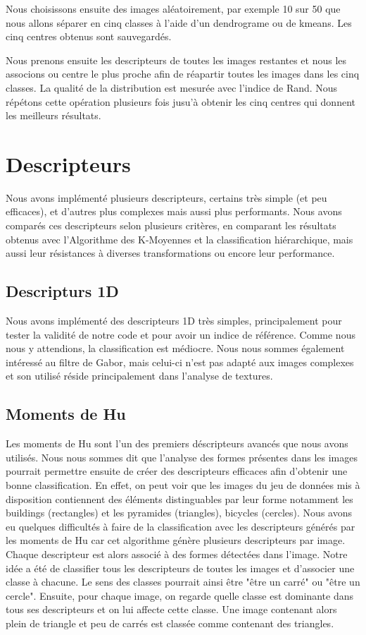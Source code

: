 \documentclass[12pt,a4paper,utf8x]{report}
\begin{document}
    Nous choisissons ensuite des images aléatoirement, par exemple 10 sur 50 que nous allons séparer en cinq classes à l'aide d'un dendrograme ou de kmeans. Les cinq centres obtenus sont sauvegardés.

    Nous prenons ensuite les descripteurs de toutes les images restantes et nous les associons ou centre le plus proche afin de réapartir toutes les images dans les cinq classes. La qualité de la distribution est mesurée avec l'indice de Rand. Nous répétons cette opération plusieurs fois jusu'à obtenir les cinq centres qui donnent les meilleurs résultats.


\chapter{Descripteurs}
    Nous avons implémenté plusieurs descripteurs, certains très simple (et peu efficaces), et d'autres plus complexes mais aussi plus performants. Nous avons comparés ces descripteurs selon plusieurs critères, en comparant les résultats obtenus avec l'Algorithme des K-Moyennes et la classification hiérarchique, mais aussi leur résistances à diverses transformations ou encore leur performance.

    \section{Descripturs 1D}
        Nous avons implémenté des descripteurs 1D très simples, principalement pour tester la validité de notre code et pour avoir un indice de référence. Comme nous nous y attendions, la classification est médiocre. Nous nous sommes également intéressé au filtre de Gabor, mais celui-ci n'est pas adapté aux images complexes et son utilisé réside principalement dans l'analyse de textures.

    \section{Moments de Hu}

        Les moments de Hu sont l'un des premiers déscripteurs avancés que nous avons utilisés. Nous nous sommes dit que l'analyse des formes présentes dans les images pourrait permettre ensuite de créer des descripteurs efficaces afin d'obtenir une bonne classification. En effet, on peut voir que les images du jeu de données mis à disposition contiennent des éléments distinguables par leur forme notamment les buildings (rectangles) et les pyramides (triangles), bicycles (cercles). Nous avons eu quelques difficultés à faire de la classification avec les descripteurs générés par les moments de Hu car cet algorithme génère plusieurs descripteurs par image. Chaque descripteur est alors associé à des formes détectées dans l'image. Notre idée a été de classifier tous les descripteurs de toutes les images et d'associer une classe à chacune. Le sens des classes pourrait ainsi être "être un carré" ou "être un cercle". Ensuite, pour chaque image, on regarde quelle classe est dominante dans tous ses descripteurs et on lui affecte cette classe. Une image contenant alors plein de triangle et peu de carrés est classée comme contenant des triangles.
\end{document}

